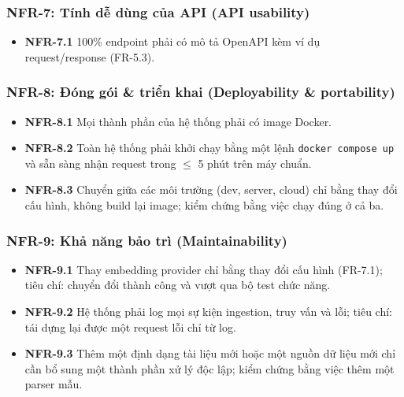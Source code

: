 \subsubsection*{NFR-7: Tính dễ dùng của API (API usability)}

\begin{itemize}
  \item \textbf{NFR-7.1} 100\% endpoint phải có mô tả OpenAPI kèm ví dụ request/response (FR-5.3).
\end{itemize}

\subsubsection*{NFR-8: Đóng gói \& triển khai (Deployability \& portability)}

\begin{itemize}
  \item \textbf{NFR-8.1} Mọi thành phần của hệ thống phải có image Docker.
  \item \textbf{NFR-8.2} Toàn hệ thống phải khởi chạy bằng một lệnh \texttt{docker compose up} và sẵn sàng nhận request trong $\leq$ 5 phút trên máy chuẩn.
  \item \textbf{NFR-8.3} Chuyển giữa các môi trường (dev, server, cloud) chỉ bằng thay đổi cấu hình, không build lại image; kiểm chứng bằng việc chạy đúng ở cả ba.
\end{itemize}

\subsubsection*{NFR-9: Khả năng bảo trì (Maintainability)}

\begin{itemize}
  \item \textbf{NFR-9.1} Thay embedding provider chỉ bằng thay đổi cấu hình (FR-7.1); tiêu chí: chuyển đổi thành công và vượt qua bộ test chức năng.
  \item \textbf{NFR-9.2} Hệ thống phải log mọi sự kiện ingestion, truy vấn và lỗi; tiêu chí: tái dựng lại được một request lỗi chỉ từ log.
  \item \textbf{NFR-9.3} Thêm một định dạng tài liệu mới hoặc một nguồn dữ liệu mới chỉ cần bổ sung một thành phần xử lý độc lập; kiểm chứng bằng việc thêm một parser mẫu.
\end{itemize}



